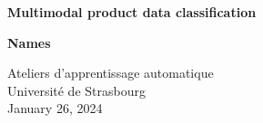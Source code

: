 \begin{titlepage}
	\centering
	\vspace*{1cm}
	\Huge
	\textbf{Multimodal product data classification}
	
	\vspace{0.5cm}
	\LARGE
	
	\vspace{1.5cm}
	
	\textbf{Names}
	
	\vfill
	
	
	\vspace{0.8cm}
	
	\Large
	Ateliers d'apprentissage automatique\\
	Université de Strasbourg\\
	January 26, 2024
\end{titlepage}